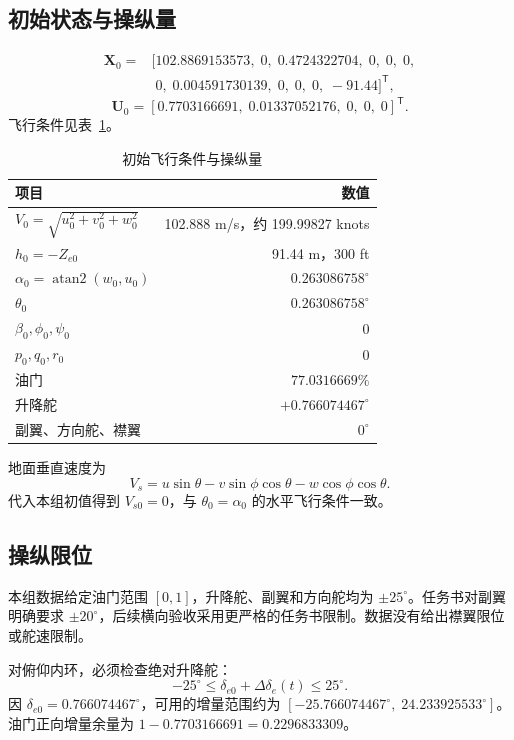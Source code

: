 \documentclass[UTF8,a4paper,11pt,fontset=windows]{ctexart}
\newcommand{\de}{\delta_e}
\begin{document}
\subsection{初始状态与操纵量}
\begin{equation}
\begin{aligned}
\bm X_0={}&[102.8869153573,\;0,\;0.4724322704,\;0,\;0,\;0,\\
 &\phantom{[}0,\;0.004591730139,\;0,\;0,\;0,\;-91.44]^{\mathsf T},
\end{aligned}
\end{equation}
\begin{equation}
\bm U_0=[0.7703166691,\;0.01337052176,\;0,\;0,\;0]^{\mathsf T}.
\end{equation}
飞行条件见表~\ref{tab:trimpoint}。
\begin{table}[H]\centering
\caption{初始飞行条件与操纵量}\label{tab:trimpoint}
\begin{tabular}{lr}\toprule
项目&数值\\\midrule
$V_0=\sqrt{u_0^2+v_0^2+w_0^2}$&102.888 m/s，约 199.99827 knots\\
$h_0=-Z_{e0}$&91.44 m，300 ft\\
$\alpha_0=\operatorname{atan2}(w_0,u_0)$&$0.263086758^\circ$\\
$\theta_0$&$0.263086758^\circ$\\
$\beta_0,\phi_0,\psi_0$&$0$\\
$p_0,q_0,r_0$&$0$\\
油门&$77.0316669\%$\\
升降舵&$+0.766074467^\circ$\\
副翼、方向舵、襟翼&$0^\circ$\\\bottomrule
\end{tabular}
\end{table}

地面垂直速度为
\begin{equation}\label{eq:vs}
V_s=u\sin\theta-v\sin\phi\cos\theta-w\cos\phi\cos\theta.
\end{equation}
代入本组初值得到 $V_{s0}=0$，与 $\theta_0=\alpha_0$ 的水平飞行条件一致。

\subsection{操纵限位}
本组数据给定油门范围 $[0,1]$，升降舵、副翼和方向舵均为 $\pm25^\circ$。任务书对副翼明确要求 $\pm20^\circ$，后续横向验收采用更严格的任务书限制。数据没有给出襟翼限位或舵速限制。

对俯仰内环，必须检查绝对升降舵：
\begin{equation}\label{eq:limit}
-25^\circ\leq\delta_{e0}+\Delta\de(t)\leq25^\circ.
\end{equation}
因 $\delta_{e0}=0.766074467^\circ$，可用的增量范围约为
$[-25.766074467^\circ,\;24.233925533^\circ]$。油门正向增量余量为 $1-0.7703166691=0.2296833309$。
\end{document}
